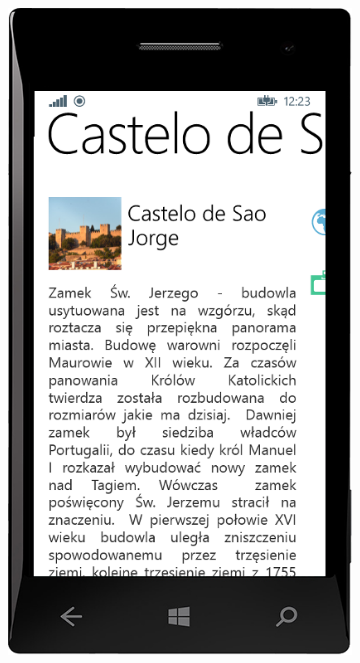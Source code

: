 \documentclass{book}
\begin{document}
\begin{figure}[H]
\begin{subfigure}{0.3\textwidth}
						\includegraphics[width=\textwidth]{screenshots/mobile/mobile11.png}	
						\caption{\label{subfig:mobile_place}}	
					\end{subfigure}
					\hfill
					\begin{subfigure}{0.3\textwidth}

\end{subfigure}
\end{figure}
\end{document}
